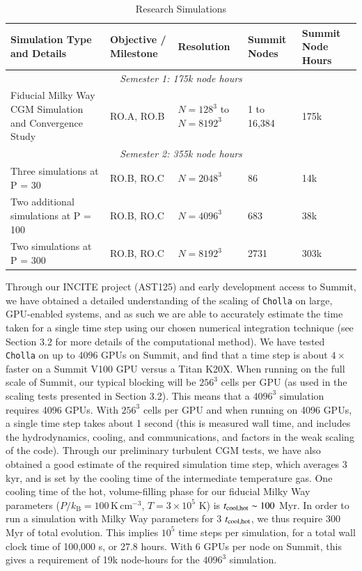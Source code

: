 \documentclass[11pt,letterpaper,english]{article}
\begin{document}
\begin{table}[h]
\caption{Research Simulations}
\label{table:RS}
\begin{tabular}{|p{2.5in}|p{1in}|p{0.7in}|p{0.5in}|p{0.7in}|} 
\hline
{\bf Simulation Type and Details} & {\bf Objective / Milestone} & {\bf Resolution} & {\bf Summit Nodes} & {\bf Summit Node Hours} \\ \hline
\multicolumn{5}{|c|}{\it Semester 1: 175k node hours} \\ \hline
Fiducial Milky Way CGM Simulation and Convergence Study & RO.A, RO.B & $N = 128^3$ to $N=8192^3$ & 1 to 16,384 & 175k \\ \hline
\multicolumn{5}{|c|}{\it Semester 2: 355k node hours} \\ \hline
Three simulations at P = 30 & RO.B, RO.C & $N = 2048^3$ & 86 & 14k\\ \hline
Two additional simulations at P = 100 & RO.B, RO.C & $N=4096^3$ & 683 & 38k \\ \hline
Two simulations at P = 300 & RO.B, RO.C & $N=8192^3$ & 2731 & 303k \\ \hline
\end{tabular}
\end{table}


Through our INCITE project (AST125) and early development access to Summit, we have obtained a detailed understanding of the scaling of {\tt Cholla} on large, GPU-enabled systems, and as such we are able to accurately estimate the time taken for a single time step using our chosen numerical integration technique (see Section 3.2 for more details of the computational method). We have tested {\tt Cholla} on up to 4096 GPUs on Summit, and find that a time step is about $4\times$ faster on a Summit V100 GPU versus a Titan K20X. When running on the full scale of Summit, our typical blocking will be $256^3$ cells per GPU (as used in the scaling tests presented in Section 3.2). This means that a $4096^3$ simulation requires 4096 GPUs. With $256^3$ cells per GPU and when running on 4096 GPUs, a single time step takes about 1 second (this is measured wall time, and includes the hydrodynamics, cooling, and communications, and factors in the weak scaling of the code). Through our preliminary turbulent CGM tests, we have also obtained a good estimate of the required simulation time step, which averages 3 kyr, and is set by the cooling time of the intermediate temperature gas. One cooling time of the hot, volume-filling phase for our fiducial Milky Way parameters ($P/k_\mathrm{B} = 100\,\mathrm{K}\,\mathrm{cm}^{-3}$, $T = 3\times10^5$ K) is $t_{\rm cool,hot} \sim100$ Myr. In order to run a simulation with Milky Way parameters for 3 $t_{\rm cool,hot}$, we thus require 300 Myr of total evolution. This implies $10^5$ time steps per simulation, for a total wall clock time of 100,000 s, or 27.8 hours. With 6 GPUs per node on Summit, this gives a requirement of 19k node-hours for the $4096^3$ simulation.
\end{document}
